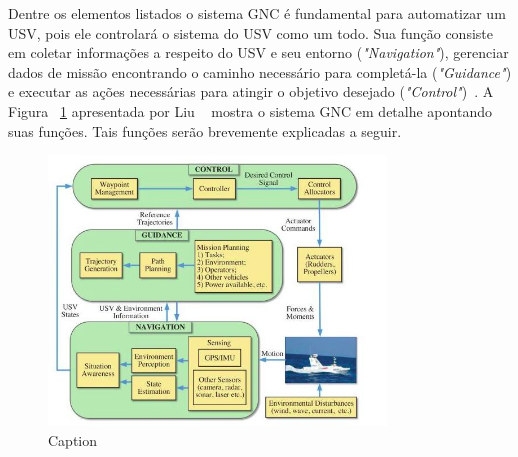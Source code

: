         Dentre os elementos listados o sistema GNC é fundamental para automatizar um USV, pois ele controlará o sistema do USV como um todo. Sua função consiste em coletar informações a respeito do USV e seu entorno (\textit{"Navigation"}), gerenciar dados de missão encontrando o caminho necessário para completá-la (\textit{"Guidance"}) e executar as ações necessárias para atingir o objetivo desejado (\textit{"Control"})~\cite{LIU201671}. A Figura ~\ref{fig:Liu2016_gncSystem} apresentada por Liu \etal~\cite{LIU201671} mostra o sistema GNC em detalhe apontando suas funções. Tais funções serão brevemente explicadas a seguir.
        
        \begin{figure}
            \centering
            \includegraphics[width=0.8\textwidth]{fig/chap2/gnc_system.png}
            \caption{Caption}
            \label{fig:Liu2016_gncSystem}
        \end{figure}
        
